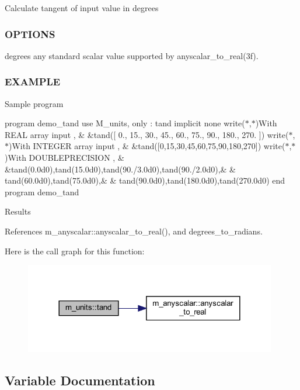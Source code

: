 Calculate tangent of input value in degrees

\subsubsection*{O\+P\+T\+I\+O\+NS}

degrees any standard scalar value supported by anyscalar\+\_\+to\+\_\+real(3f). \subsubsection*{E\+X\+A\+M\+P\+LE}

Sample program

program demo\+\_\+tand use M\+\_\+units, only \+: tand implicit none write($\ast$,$\ast$)\textquotesingle{}With R\+E\+AL array input \textquotesingle{}, \& \&tand(\mbox{[} 0., 15., 30., 45., 60., 75., 90., 180., 270. \mbox{]}) write($\ast$,$\ast$)\textquotesingle{}With I\+N\+T\+E\+G\+ER array input \textquotesingle{}, \& \&tand(\mbox{[}0,15,30,45,60,75,90,180,270\mbox{]}) write($\ast$,$\ast$)\textquotesingle{}With D\+O\+U\+B\+L\+E\+P\+R\+E\+C\+I\+S\+I\+ON \textquotesingle{}, \& \&tand(0.\+0d0),tand(15.\+0d0),tand(90./3.0d0),tand(90./2.0d0),\& \& tand(60.\+0d0),tand(75.\+0d0),\& \& tand(90.\+0d0),tand(180.\+0d0),tand(270.\+0d0) end program demo\+\_\+tand

Results 

References m\+\_\+anyscalar\+::anyscalar\+\_\+to\+\_\+real(), and degrees\+\_\+to\+\_\+radians.

Here is the call graph for this function\+:
\nopagebreak
\begin{figure}[H]
\begin{center}
\leavevmode
\includegraphics[width=312pt]{namespacem__units_ac2c6550d996061015c6b4178048e4967_cgraph}
\end{center}
\end{figure}


\subsection{Variable Documentation}
\mbox{\label{namespacem__units_a3ffc2cf87c0db17c71fa0a7bbee8eb9c}} 
